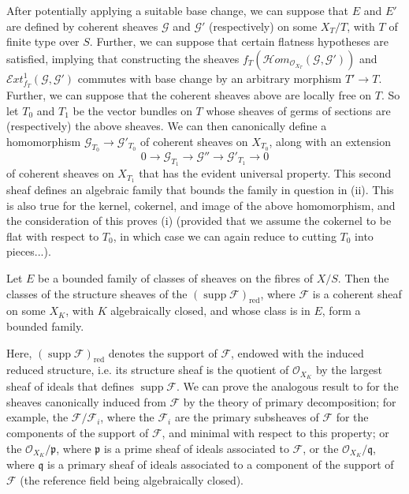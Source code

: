 \begin{cproof}
  After potentially applying a suitable base change, we can suppose that $E$ and $E'$ are defined by coherent sheaves $\mathcal{G}$ and $\mathcal{G}'$ (respectively) on some $X_T/T$, with $T$ of finite type over $S$.
  Further, we can suppose that certain flatness hypotheses are satisfied, implying that constructing the sheaves $f_T(\mathcal{H}om_{\mathcal{O}_{X_T}}(\mathcal{G},\mathcal{G}'))$ and $\mathcal{E}xt_{f_T}^1(\mathcal{G},\mathcal{G}')$ commutes with base change by an arbitrary morphism $T'\to T$.
  Further, we can suppose that the coherent sheaves above are locally free on $T$.
  So let $T_0$ and $T_1$ be the vector bundles on $T$ whose sheaves of germs of sections are (respectively) the above sheaves.
  We can then canonically define a homomorphism $\mathcal{G}_{T_0}\to\mathcal{G}'_{T_0}$ of coherent sheaves on $X_{T_0}$, along with an extension
  \[
    0 \to \mathcal{G}_{T_1} \to \mathcal{G}'' \to \mathcal{G}'_{T_1} \to 0
  \]
  of coherent sheaves on $X_{T_1}$ that has the evident universal property.
  This second sheaf defines an algebraic family that bounds the family in question in (ii).
  This is also true for the kernel, cokernel, and image of the above homomorphism, and the consideration of this proves (i) (provided that we assume the cokernel to be flat with respect to $T_0$, in which case we can again reduce to cutting $T_0$ into pieces...).
\end{cproof}

\begin{proposition}\label{fga3.iv-1-proposition-1.3}
  Let $E$ be a bounded family of classes of sheaves on the fibres of $X/S$.
  Then the classes of the structure sheaves of the $(\operatorname{supp}\mathcal{F})_\mathrm{red}$, where $\mathcal{F}$ is a coherent sheaf on some $X_K$, with $K$ algebraically closed, and whose class is in $E$, form a bounded family.
\end{proposition}

Here, $(\operatorname{supp}\mathcal{F})_\mathrm{red}$ denotes the support of $\mathcal{F}$, endowed with the induced reduced structure, i.e. its structure sheaf is the quotient of $\mathcal{O}_{X_K}$ by the largest sheaf of ideals that defines $\operatorname{supp}\mathcal{F}$.
We can prove the analogous result to  for the sheaves canonically induced from $\mathcal{F}$ by the theory of primary decomposition;
for example, the $\mathcal{F}/\mathcal{F}_i$, where the $\mathcal{F}_i$ are the primary subsheaves of $\mathcal{F}$ for the components of the support of $\mathcal{F}$, and minimal with respect to this property;
or the $\mathcal{O}_{X_K}/\mathfrak{p}$, where $\mathfrak{p}$ is a prime sheaf of ideals associated to $\mathcal{F}$, or the $\mathcal{O}_{X_K}/\mathfrak{q}$, where $\mathfrak{q}$ is a primary sheaf of ideals associated to a component of the support of $\mathcal{F}$ (the reference field being algebraically closed).
